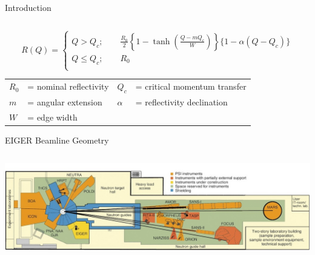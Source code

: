 \documentclass[final,t]{beamer}
\begin{document}
\begin{frame}{}
\begin{columns}[t]
\begin{column}{.3\linewidth}
\begin{block}{Introduction}
\begin{columns}
\begin{column}{.5\linewidth}
\end{column}
\end{columns}
\vspace{-4ex}
\begin{center}
\begin{equation*}\label{eq:ref}
        R(Q) = 
        \begin{cases}
            Q > Q_c;  \qquad \frac{R_0}{2}\left\{  1 - \tanh\left(  \frac{Q - m Q_c}{W}\right) \right\}\{1-\alpha(Q-Q_c)\} \\
            Q \leq Q_c; \qquad R_0 \\
        \end{cases}
    \end{equation*}

        \begin{tabular}{l l l l}
        $R_0$    & = nominal reflectivity & $ Q_c  $  & = critical momentum transfer   \\
        $m  $    & = angular extension    & $\alpha$  & = reflectivity declination  \\
        $W  $    & = edge width           &           &   
        \end{tabular}
\end{center} 
      \end{block}

      \vspace{3ex}
      \begin{block}{EIGER Beamline Geometry}
      
        \begin{columns}[T]
          \begin{column}{.75\linewidth}
        
        \includegraphics*[width=\linewidth]{exp.jpg}


\end{column}
\end{columns}
\end{block}
\end{column}
\end{columns}
\end{frame}
\end{document}
